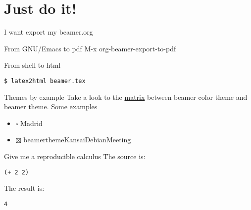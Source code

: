 \documentclass[unicode,presentation,c,squeeze,shrink,10pt]{beamer}
\begin{document}
\section{Just do it!}
\label{sec-3}
\begin{frame}[fragile,label=sec-3-1]{I want export my beamer.org}
 \begin{block}{From GNU/Emacs to pdf}
M-x org-beamer-export-to-pdf
\end{block}
\begin{block}{From shell to html}
\begin{verbatim}
$ latex2html beamer.tex
\end{verbatim}
\end{block}
\end{frame}
\begin{frame}[label=sec-3-2]{Themes by example}
Take a look to the \href{http://deic.uab.es/~iblanes/beamer_gallery/index_by_theme.html}{matrix} between beamer color theme and beamer theme.
Some examples
\begin{itemize}
\item $\square$ Madrid
\item $\boxtimes$ beamerthemeKansaiDebianMeeting
\end{itemize}
\end{frame}
\begin{frame}[fragile,label=sec-3-3]{Give me a reproducible calculus}
 The source is:
\begin{verbatim}
(+ 2 2)
\end{verbatim}

The result is:
\begin{verbatim}
4
\end{verbatim}
\end{frame}
\end{document}

